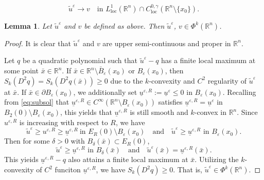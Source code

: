 \documentclass[10pt,a4paper]{amsart}
\newtheorem{lemma}{Lemma}
\begin{document}
\begin{equation}\label{eq:u-e-v}
	\tilde{u}^\varepsilon\to v\quad\text{in }L^1_{\mathrm{loc}}(\mathbb{R}^n)\cap C^{0,\gamma}_{\mathrm{loc}}(\mathbb{R}^n\setminus\{x_0\}).
\end{equation}

\begin{lemma}\label{lem:Phi-k}
	Let $\tilde{u}^\varepsilon$ and $v$ be defined as above. Then $\tilde{u}^\varepsilon$, $v\in\Phi^k(\mathbb{R}^n)$.
\end{lemma}

\begin{proof}
	It is clear that $\tilde{u}^\varepsilon$ and $v$ are upper semi-continuous and proper in $\mathbb{R}^n$. 

	Let $q$ be a quadratic polynomial such that $\tilde{u}^\varepsilon-q$ has a finite local maximum at some point $\bar{x}\in\mathbb{R}^n  $. If $\bar{x}\in\mathbb{R}^n\setminus\bar{B}_\varepsilon(x_0)$ or $B_\varepsilon(x_0)$, then $S_k(D^2q)=S_k(D^2q(\bar{x}))\geq0$ due to the $k$-convexity and $C^2$ regularity of $\tilde{u}^\varepsilon$ at $\bar{x}$. If $\bar{x}\in\partial B_\varepsilon(x_0)$, we additionally set $\underline{u}^{\varepsilon,R}:=\underline{u}^\varepsilon\leq0$ in $B_\varepsilon(x_0)$. 
	Recalling from \eqref{eq:subsol} that $\underline{u}^{\varepsilon,R}\in C^{\infty}(\mathbb{R}^n\setminus B_\varepsilon(x_0))$ satisfies $\underline{u}^{\varepsilon,R}=\underline u^\varepsilon$ in $B_2(0)\setminus B_\varepsilon(x_0)$, this yields that $\underline{u}^{\varepsilon,R}$ is still smooth and $k$-convex in $\mathbb{R}^n$. Since $u^{\varepsilon,R}$ is increasing with respect to $R$, we have
	$$\tilde{u}^\varepsilon\geq u^{\varepsilon,R}\geq\underline{u}^{\varepsilon,R}\ \text{in }E_R(0)\setminus B_\varepsilon(x_0)\quad\text{and}\quad\tilde{u}^\varepsilon\geq\underline{u}^{\varepsilon,R}\text{ in }B_\varepsilon(x_0).$$ 
	Then for some $\delta>0$ with $B_\delta(\bar{x})\subset E_R(0)  $, 
	$$\tilde{u}^\varepsilon\geq\underline{u}^{\varepsilon,R}\text{ in }B_\delta(\bar{x})\quad\text{and}\quad\tilde{u}^\varepsilon(\bar{x})=\underline{u}^{\varepsilon,R}(\bar{x}).$$
	This yieids $\underline{u}^{\varepsilon,R}-q$ also attains a finite local maximum at $\bar{x}$. Utilizing the $k$-convexity of $C^2$ funciton $\underline{u}^{\varepsilon,R}$, we have $S_k(D^2q)\geq0$. That is, $\tilde{u}^\varepsilon\in\Phi^k(\mathbb{R}^n)$.
	

\end{proof}
\end{document}
